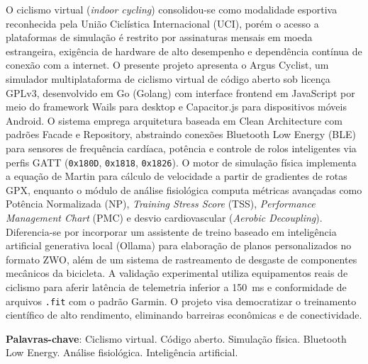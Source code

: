 \documentclass[
    a4paper,
    12pt,
    oneside,
    english,
    brazil,
    chapter=TITLE,
    section=TITLE,
]{abntex2}
\begin{document}
\begin{resumo}
O ciclismo virtual (\textit{indoor cycling}) consolidou-se como modalidade esportiva reconhecida pela União Ciclística Internacional (UCI), porém o acesso a plataformas de simulação é restrito por assinaturas mensais em moeda estrangeira, exigência de hardware de alto desempenho e dependência contínua de conexão com a internet. O presente projeto apresenta o Argus Cyclist, um simulador multiplataforma de ciclismo virtual de código aberto sob licença GPLv3, desenvolvido em Go (Golang) com interface frontend em JavaScript por meio do framework Wails para desktop e Capacitor.js para dispositivos móveis Android. O sistema emprega arquitetura baseada em Clean Architecture com padrões Facade e Repository, abstraindo conexões Bluetooth Low Energy (BLE) para sensores de frequência cardíaca, potência e controle de rolos inteligentes via perfis GATT (\texttt{0x180D}, \texttt{0x1818}, \texttt{0x1826}). O motor de simulação física implementa a equação de Martin para cálculo de velocidade a partir de gradientes de rotas GPX, enquanto o módulo de análise fisiológica computa métricas avançadas como Potência Normalizada (NP), \textit{Training Stress Score} (TSS), \textit{Performance Management Chart} (PMC) e desvio cardiovascular (\textit{Aerobic Decoupling}). Diferencia-se por incorporar um assistente de treino baseado em inteligência artificial generativa local (Ollama) para elaboração de planos personalizados no formato ZWO, além de um sistema de rastreamento de desgaste de componentes mecânicos da bicicleta. A validação experimental utiliza equipamentos reais de ciclismo para aferir latência de telemetria inferior a \SI{150}{\milli\second} e conformidade de arquivos \texttt{.fit} com o padrão Garmin. O projeto visa democratizar o treinamento científico de alto rendimento, eliminando barreiras econômicas e de conectividade.

\textbf{Palavras-chave}: Ciclismo virtual. Código aberto. Simulação física. Bluetooth Low Energy. Análise fisiológica. Inteligência artificial.
\end{resumo}
\end{document}
